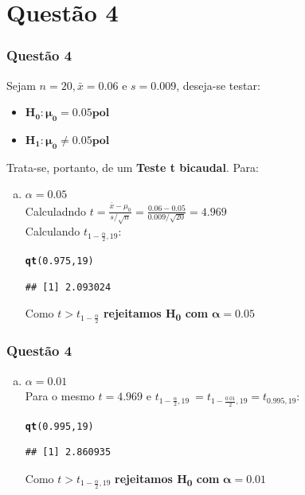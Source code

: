 \documentclass{beamer}\usepackage[]{graphicx}\usepackage[]{color}
\makeatletter
\newcommand{\hlnum}[1]{\textcolor[rgb]{0.686,0.059,0.569}{#1}}%
\newcommand{\hlstd}[1]{\textcolor[rgb]{0.345,0.345,0.345}{#1}}%
\newcommand{\hlkwd}[1]{\textcolor[rgb]{0.737,0.353,0.396}{\textbf{#1}}}%
\newenvironment{kframe}{%
 \def\at@end@of@kframe{}%
 \ifinner\ifhmode%
  \def\at@end@of@kframe{\end{minipage}}%
  \begin{minipage}{\columnwidth}%
 \fi\fi%
 \def\FrameCommand##1{\hskip\@totalleftmargin \hskip-\fboxsep
 \colorbox{shadecolor}{##1}\hskip-\fboxsep
     \hskip-\linewidth \hskip-\@totalleftmargin \hskip\columnwidth}%
 \MakeFramed {\advance\hsize-\width
   \@totalleftmargin\z@ \linewidth\hsize
   \@setminipage}}%
 {\par\unskip\endMakeFramed%
 \at@end@of@kframe}
\newenvironment{knitrout}{}{} %
\makeatother
\begin{document}
	\section{Questão 4}
	\begin{frame}[fragile]
			\frametitle{Questão 4}
			Sejam $n = 20, \bar{x} = 0.06$ e $s = 0.009$, deseja-se testar:
			\begin{itemize}
				\item $\boldsymbol{H_{0}:  \mu_{0} = 0.05pol}$
				\item $\boldsymbol{H_{1}:  \mu_{0} \neq 0.05pol}$
			\end{itemize}
			Trata-se, portanto, de um \textbf{Teste t bicaudal}.  Para:
			\begin{enumerate}[a)]
				\item $\alpha = 0.05$\\
				Calculadndo $t = \frac{\bar{x} - \mu_{0}}{s/\sqrt{n}} = \frac{0.06 - 0.05}{0.009/\sqrt{20}} = 4.969$\\
				Calculando $t_{1-\frac{\alpha}{2},19}$:
\begin{knitrout}
\color{fgcolor}\begin{kframe}
\begin{alltt}
\hlkwd{qt}\hlstd{(}\hlnum{0.975}\hlstd{,}\hlnum{19}\hlstd{)}
\end{alltt}
\begin{verbatim}
## [1] 2.093024
\end{verbatim}
\end{kframe}
\end{knitrout}
                        Como $t > t_{1-\frac{\alpha}{2}} $ \textbf{rejeitamos H\textsubscript{0} com} $\boldsymbol{\alpha = 0.05}$
			\end{enumerate}
		\end{frame}
		
		\begin{frame}[fragile]
			\frametitle{Questão 4}
			\begin{enumerate}[b)]
				\item $\alpha  = 0.01$\\
				Para o mesmo $t = 4.969$ e $t_{1-\frac{\alpha}{2},19} \ = t_{1-\frac{0.01}{2},19} = t_{0.995,19} $:
\begin{knitrout}
\color{fgcolor}\begin{kframe}
\begin{alltt}
\hlkwd{qt}\hlstd{(}\hlnum{0.995}\hlstd{,}\hlnum{19}\hlstd{)}
\end{alltt}
\begin{verbatim}
## [1] 2.860935
\end{verbatim}
\end{kframe}
\end{knitrout}
			Como $t > t_{1-\frac{\alpha}{2},19}$ \textbf{rejeitamos H\textsubscript{0} com} $\boldsymbol{\alpha = 0.01}$
			\end{enumerate}
		\end{frame}
		
\end{document}

